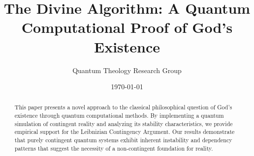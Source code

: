 \documentclass[12pt,a4paper]{article}
\title{The Divine Algorithm: A Quantum Computational Proof of God's Existence}
\author{Quantum Theology Research Group}
\date{\today}
\begin{document}
\maketitle

\begin{abstract}
This paper presents a novel approach to the classical philosophical question of God's existence through quantum computational methods. By implementing a quantum simulation of contingent reality and analyzing its stability characteristics, we provide empirical support for the Leibnizian Contingency Argument. Our results demonstrate that purely contingent quantum systems exhibit inherent instability and dependency patterns that suggest the necessity of a non-contingent foundation for reality.
\end{abstract}

\tableofcontents







\appendix


\printbibliography
\end{document}
